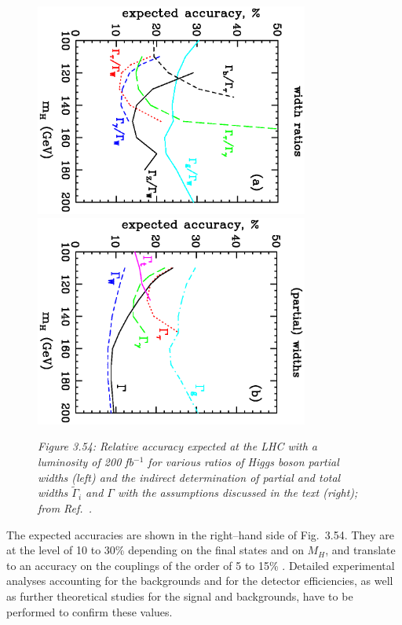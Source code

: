 \begin{figure}[!h]
\vspace*{2mm}
\begin{center}
\includegraphics[width=9.0cm,angle=90]{./sm3/LHC-meas-ratio.ps} \hspace*{1cm}
\includegraphics[width=9.0cm,angle=90]{./sm3/LHC-meas-Gammai.ps}
\end{center}
\vspace*{-.2cm}
{\it Figure 3.54: Relative accuracy expected at the LHC with a luminosity of 
200 fb$^{-1}$ for various ratios of Higgs boson partial widths (left) and 
the indirect determination of partial and total widths $\tilde\Gamma_i$ and 
$\Gamma$ with the assumptions discussed in the text (right); from 
Ref.~\cite{Duhrssen}.} 
\vspace*{-.2cm}
\end{figure}

The expected accuracies are shown in the right--hand side of Fig.~3.54.  They
are at the level of 10 to 30\% depending on the final states and on $M_H$, and
translate to an accuracy on the couplings of the order of 5 to 15\%
\cite{Duhrssen}.  Detailed experimental analyses accounting for the backgrounds
and for the detector efficiencies, as well as further theoretical studies for
the signal and backgrounds, have to be performed to confirm these values.  

